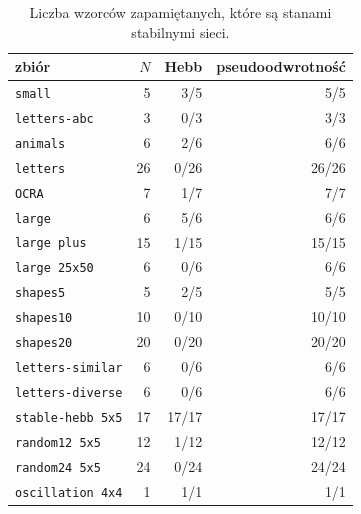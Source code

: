 \begin{table}[htbp]
\centering
\small
\begin{tabular}{lrrr}
\toprule
zbiór & $N$ & Hebb & pseudoodwrotność \\
\midrule
\texttt{small} & 5 & 3/5 & 5/5 \\
\texttt{letters-abc} & 3 & 0/3 & 3/3 \\
\texttt{animals} & 6 & 2/6 & 6/6 \\
\texttt{letters} & 26 & 0/26 & 26/26 \\
\texttt{OCRA} & 7 & 1/7 & 7/7 \\
\texttt{large} & 6 & 5/6 & 6/6 \\
\texttt{large plus} & 15 & 1/15 & 15/15 \\
\texttt{large 25x50} & 6 & 0/6 & 6/6 \\
\midrule
\texttt{shapes5} & 5 & 2/5 & 5/5 \\
\texttt{shapes10} & 10 & 0/10 & 10/10 \\
\texttt{shapes20} & 20 & 0/20 & 20/20 \\
\midrule
\texttt{letters-similar} & 6 & 0/6 & 6/6 \\
\texttt{letters-diverse} & 6 & 0/6 & 6/6 \\
\texttt{stable-hebb 5x5} & 17 & 17/17 & 17/17 \\
\texttt{random12 5x5} & 12 & 1/12 & 12/12 \\
\texttt{random24 5x5} & 24 & 0/24 & 24/24 \\
\texttt{oscillation 4x4} & 1 & 1/1 & 1/1 \\
\bottomrule
\end{tabular}
\caption{Liczba wzorców zapamiętanych, które są stanami stabilnymi sieci.}
\label{tab:stabilnosc}
\end{table}
